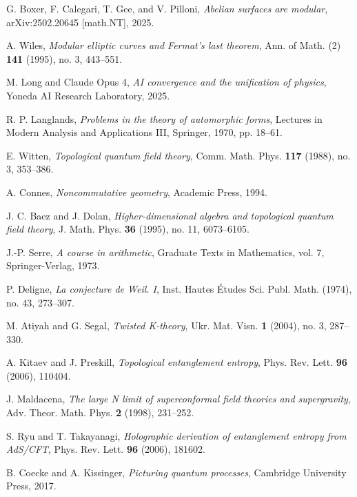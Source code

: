 \documentclass[12pt,a4paper]{article}
\begin{document}

\begin{thebibliography}{99}

G. Boxer, F. Calegari, T. Gee, and V. Pilloni,
\textit{Abelian surfaces are modular},
arXiv:2502.20645 [math.NT], 2025.

A. Wiles,
\textit{Modular elliptic curves and Fermat's last theorem},
Ann. of Math. (2) \textbf{141} (1995), no. 3, 443--551.

M. Long and Claude Opus 4,
\textit{AI convergence and the unification of physics},
Yoneda AI Research Laboratory, 2025.

R. P. Langlands,
\textit{Problems in the theory of automorphic forms},
Lectures in Modern Analysis and Applications III,
Springer, 1970, pp. 18--61.

E. Witten,
\textit{Topological quantum field theory},
Comm. Math. Phys. \textbf{117} (1988), no. 3, 353--386.

A. Connes,
\textit{Noncommutative geometry},
Academic Press, 1994.

J. C. Baez and J. Dolan,
\textit{Higher-dimensional algebra and topological quantum field theory},
J. Math. Phys. \textbf{36} (1995), no. 11, 6073--6105.

J.-P. Serre,
\textit{A course in arithmetic},
Graduate Texts in Mathematics, vol. 7, Springer-Verlag, 1973.

P. Deligne,
\textit{La conjecture de Weil. I},
Inst. Hautes \'Etudes Sci. Publ. Math. (1974), no. 43, 273--307.

M. Atiyah and G. Segal,
\textit{Twisted K-theory},
Ukr. Mat. Visn. \textbf{1} (2004), no. 3, 287--330.

A. Kitaev and J. Preskill,
\textit{Topological entanglement entropy},
Phys. Rev. Lett. \textbf{96} (2006), 110404.

J. Maldacena,
\textit{The large N limit of superconformal field theories and supergravity},
Adv. Theor. Math. Phys. \textbf{2} (1998), 231--252.

S. Ryu and T. Takayanagi,
\textit{Holographic derivation of entanglement entropy from AdS/CFT},
Phys. Rev. Lett. \textbf{96} (2006), 181602.

B. Coecke and A. Kissinger,
\textit{Picturing quantum processes},
Cambridge University Press, 2017.


\end{thebibliography}
\end{document}
